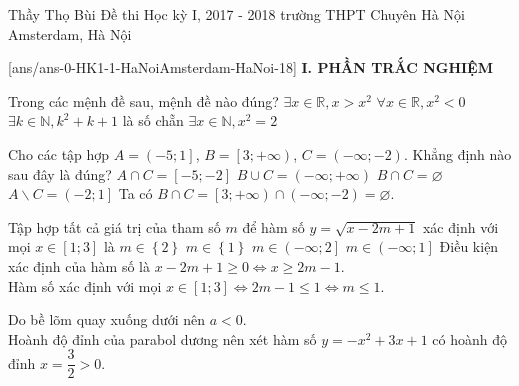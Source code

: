 	\begin{name}
		{Thầy Thọ Bùi}
		{Đề thi Học kỳ I, 2017 - 2018 trường THPT Chuyên Hà Nội Amsterdam, Hà Nội}
	\end{name}
	\setcounter{ex}{0}\setcounter{bt}{0}
	[ans/ans-0-HK1-1-HaNoiAmsterdam-HaNoi-18]
\noindent\textbf{I. PHẦN TRẮC NGHIỆM}
\begin{ex}%
	Trong các mệnh đề sau, mệnh đề nào đúng?
	\choice
	{\True $\exists x\in\mathbb{R}, x>x^2$}
	{$\forall x\in\mathbb{R}, x^2<0$}
	{$\exists k\in\mathbb{N}, k^2+k+1$ là số chẵn}
	{$\exists x\in\mathbb{N}, x^2=2$}
\end{ex}

\begin{ex}%
Cho các tập hợp $A=\left(-5;1\right]$, $B=\left[3;+\infty\right)$, $C=\left(-\infty;-2\right)$. Khẳng định nào sau đây là đúng?
\choice
{$A\cap C=\left[-5;-2\right]$}
{$B\cup C=\left(-\infty;+\infty\right)$}
{\True $B\cap C=\varnothing$}
{$A\backslash C=\left(-2;1\right]$}
\loigiai
{Ta có $B\cap C=\left[3;+\infty\right)\cap\left(-\infty;-2\right)=\varnothing$.}
\end{ex}

\begin{ex}%
Tập hợp tất cả giá trị của tham số $m$ để hàm số $y=\sqrt{x-2m+1}$ xác định với mọi $x\in\left[1;3\right]$ là
\choice
{$m\in\left\{2\right\}$}
{$m\in\left\{1\right\}$}
{$m\in\left(-\infty;2\right]$}
{\True $m\in\left(-\infty;1\right]$}
\loigiai
{Điều kiện xác định của hàm số là $x-2m+1\geq 0\Leftrightarrow x\geq 2m-1$.\\Hàm số xác định với mọi $x\in\left[1;3\right]\Leftrightarrow 2m-1\leq 1\Leftrightarrow m\leq 1$.}
\end{ex}

\begin{ex}%
\loigiai
{Do bề lõm quay xuống dưới nên $a<0$.\\Hoành độ đỉnh của parabol dương nên xét hàm số $y=-x^2+3x+1$ có hoành độ đỉnh $x=\dfrac{3}{2}>0$.}
\end{ex}

